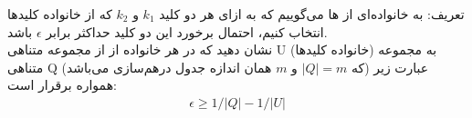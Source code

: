 تعریف: به خانواده‌ای از ها  می‌گوییم که به ازای هر دو کلید $k_1$ و $k_2$ که از خانواده کلیدها انتخاب کنیم،
احتمال برخورد این دو کلید حداکثر برابر $\epsilon$ باشد.
\\
نشان دهید که در هر خانواده از  از مجموعه متناهی U (خانواده کلیدها) به مجموعه متناهی Q (که $|Q|=m$ و $m$ همان اندازه جدول درهم‌سازی می‌باشد) عبارت زیر همواره برقرار است:
\begin{gather*} \epsilon \geq 1/|Q| - 1/|U| \end{gather*}